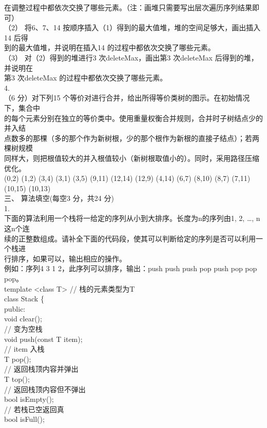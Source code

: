 \begin{question}
在调整过程中都依次交换了哪些元素。（注：画堆只需要写出层次遍历序列结果即可）\\
（2） 将6、7、14 按顺序插入（1）得到的最大值堆，堆的空间足够大，画出插入14 后得\\
到的最大值堆，并说明在插入14 的过程中都依次交换了哪些元素。\\
（3） 对（2）得到的堆进行3 次deleteMax，画出第3 次deleteMax 后得到的堆，并说明在\\
第3 次deleteMax 的过程中都依次交换了哪些元素。\\
4.\\
（6 分）对下列15 个等价对进行合并，给出所得等价类树的图示。在初始情况下，集合中\\
的每个元素分别在独立的等价类中。使用重量权衡合并规则，合并时子树结点少的并入结\\
点数多的那棵（多的那个作为新树根，少的那个根作为新根的直接子结点）；若两棵树规模\\
同样大，则把根值较大的并入根值较小（新树根取值小的）。同时，采用路径压缩优化。\\
(0,2) (1,2) (3,4) (3,1) (3,5) (9,11) (12,14) (12,9) (4,14) (6,7) (8,10) (8,7) (7,11) (10,15) (10,13)\\
三、 算法填空(每空3 分，共24 分)\\
1.\\
下面的算法利用一个栈将一给定的序列从小到大排序。长度为n的序列由1, 2, …, n这n个连\\
续的正整数组成。请补全下面的代码段，使其可以判断给定的序列是否可以利用一个栈进\\
行排序，如果可以，输出相应的操作。\\
例如：序列4 3 1 2，此序列可以排序，输出：push push push pop push pop pop pop。\\
template <class T>                            // 栈的元素类型为T\\
class Stack \{\\
public:\\
void clear();\\
// 变为空栈\\
void push(const T item);\\
//  item 入栈\\
T pop();\\
// 返回栈顶内容并弹出\\
T top();\\
// 返回栈顶内容但不弹出\\
bool isEmpty();\\
// 若栈已空返回真\\
bool isFull();\\

\end{question}
